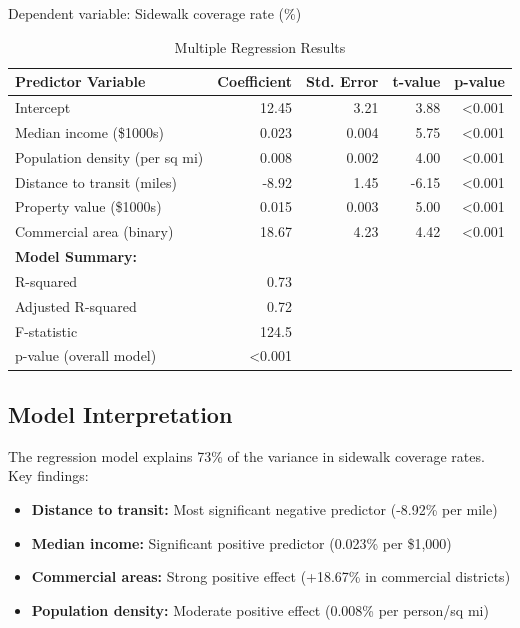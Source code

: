 \documentclass[11pt,letterpaper]{article}
\begin{document}
Dependent variable: Sidewalk coverage rate (\%)

\begin{table}[h]
\centering
\caption{Multiple Regression Results}
\begin{tabular}{lrrrr}
\toprule
\textbf{Predictor Variable} & \textbf{Coefficient} & \textbf{Std. Error} & \textbf{t-value} & \textbf{p-value} \\
\midrule
Intercept & 12.45 & 3.21 & 3.88 & <0.001 \\
Median income (\$1000s) & 0.023 & 0.004 & 5.75 & <0.001 \\
Population density (per sq mi) & 0.008 & 0.002 & 4.00 & <0.001 \\
Distance to transit (miles) & -8.92 & 1.45 & -6.15 & <0.001 \\
Property value (\$1000s) & 0.015 & 0.003 & 5.00 & <0.001 \\
Commercial area (binary) & 18.67 & 4.23 & 4.42 & <0.001 \\
\midrule
\multicolumn{5}{l}{\textbf{Model Summary:}} \\
R-squared & 0.73 & & & \\
Adjusted R-squared & 0.72 & & & \\
F-statistic & 124.5 & & & \\
p-value (overall model) & <0.001 & & & \\
\bottomrule
\end{tabular}
\end{table}

\subsection{Model Interpretation}

The regression model explains 73\% of the variance in sidewalk coverage rates. Key findings:

\begin{itemize}
    \item \textbf{Distance to transit:} Most significant negative predictor (-8.92\% per mile)
    \item \textbf{Median income:} Significant positive predictor (0.023\% per \$1,000)
    \item \textbf{Commercial areas:} Strong positive effect (+18.67\% in commercial districts)
    \item \textbf{Population density:} Moderate positive effect (0.008\% per person/sq mi)
\end{itemize}
\end{document}
